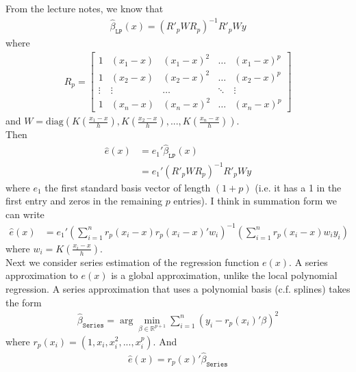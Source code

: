 \documentclass[12pt]{article}
\newcommand{\R}{\mathbb{R}}
\newcommand{\mtx}[1]{\ensuremath{\bm{\mathit{#1}}}}
\begin{document}
From the lecture notes, we know that
\begin{align*}
\hat{\mtx{\beta}}_{\texttt{LP}}(x)  = (\mtx{R}'_p \mtx{W} \mtx{R}_p)^{-1}\mtx{R}'_p \mtx{W} \mtx{y}
\end{align*}
where
\begin{align*}
\mtx{R}_p = 
\begin{bmatrix}
1 & (x_1 - x) & (x_1-x)^2 & \dots& (x_1-x)^p \\
1 & (x_2 - x) & (x_2-x)^2 & \dots &(x_2-x)^p\\
\vdots & \vdots & \dots & \ddots & \vdots \\
1 & (x_n - x) & (x_n-x)^2 & \dots &(x_n-x)^p
\end{bmatrix}
\end{align*}
and $\mtx{W} = \text{diag}\left(K\left(\frac{x_1 - x}{h}\right), K\left(\frac{x_2 - x}{h}\right),..., K\left(\frac{x_n - x}{h}\right) \right)$.\\

Then
\begin{align*}
\hat{\mtx{e}}(x) &= \mtx{e}_1'\hat{\mtx{\beta}}_{\texttt{LP}}(x)  \\
&=\mtx{e}_1'(\mtx{R}'_p \mtx{W} \mtx{R}_p)^{-1}\mtx{R}'_p \mtx{W} \mtx{y}
\end{align*}
where $ \mtx{e}_1$ the first standard basis vector of length $(1+p)$ (i.e. it has a 1 in the first entry and zeros in the remaining $p$ entries). I think in summation form we can write
\begin{align*}
\hat{\mtx{e}}(x) &= \mtx{e}_1' (\sum_{i=1}^n \mtx{r}_p(x_i-x)\mtx{r}_p(x_i-x)' w_i)^{-1}(\sum_{i=1}^n \mtx{r}_p(x_i-x)w_iy_i)
\end{align*}
where $w_i = K\left(\frac{x_i - x}{h}\right)$.\\

Next we consider series estimation of the regression function $e(x)$. A series approximation to $e(x)$ is a global approximation, unlike the local polynomial regression. A series approximation that uses a polynomial basis (c.f. splines) takes the form
\begin{align*}
\hat{\mtx{\beta}}_{\texttt{Series}} = \arg \min_{\beta \in \R^{p+1}} \sum_{i=1}^n (y_i - \mtx{r}_p(x_i)' \mtx{\beta})^2
\end{align*}
where $\mtx{r}_p(x_i) = (1, x_i, x_i^2, ..., x_i^p)$. And
\begin{align*}
\hat e(x) =  \mtx{r}_p(x)'\hat{\mtx{\beta}}_{\texttt{Series}} 
\end{align*} 
\end{document}
